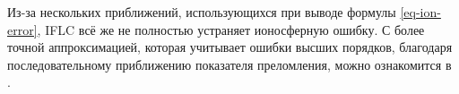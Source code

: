 Из-за нескольких приближений, использующихся при выводе формулы \eqref{eq-ion-error}, IFLC всё же не полностью устраняет ионосферную ошибку.
С более точной аппроксимацией, которая учитывает ошибки высших порядков, благодаря последовательному приближению показателя преломления, можно ознакомится в \cite{Brunner1999}. 